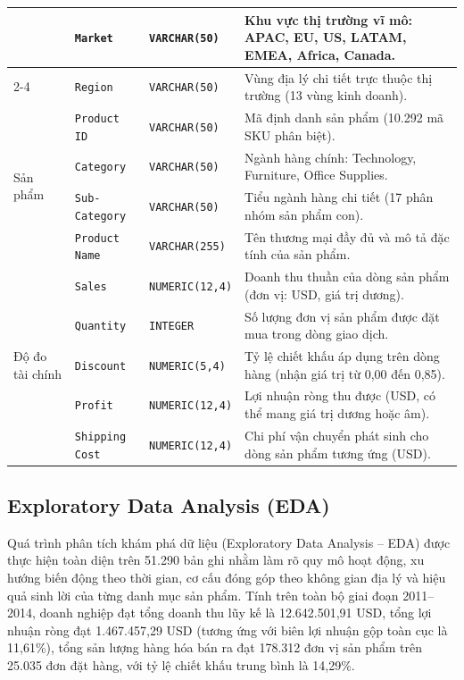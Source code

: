 \begin{table}[H]
\begin{tabularx}{\textwidth}{|l|l|l|X|}
 & \texttt{Market} & \texttt{VARCHAR(50)} & Khu vực thị trường vĩ mô: APAC, EU, US, LATAM, EMEA, Africa, Canada. \\ \cline{2-4}
 & \texttt{Region} & \texttt{VARCHAR(50)} & Vùng địa lý chi tiết trực thuộc thị trường (13 vùng kinh doanh). \\
\hline
\multirow{4}{*}{Sản phẩm} 
 & \texttt{Product ID} & \texttt{VARCHAR(50)} & Mã định danh sản phẩm (10.292 mã SKU phân biệt). \\ \cline{2-4}
 & \texttt{Category} & \texttt{VARCHAR(50)} & Ngành hàng chính: Technology, Furniture, Office Supplies. \\ \cline{2-4}
 & \texttt{Sub-Category} & \texttt{VARCHAR(50)} & Tiểu ngành hàng chi tiết (17 phân nhóm sản phẩm con). \\ \cline{2-4}
 & \texttt{Product Name} & \texttt{VARCHAR(255)} & Tên thương mại đầy đủ và mô tả đặc tính của sản phẩm. \\
\hline
\multirow{5}{*}{Độ đo tài chính} 
 & \texttt{Sales} & \texttt{NUMERIC(12,4)} & Doanh thu thuần của dòng sản phẩm (đơn vị: USD, giá trị dương). \\ \cline{2-4}
 & \texttt{Quantity} & \texttt{INTEGER} & Số lượng đơn vị sản phẩm được đặt mua trong dòng giao dịch. \\ \cline{2-4}
 & \texttt{Discount} & \texttt{NUMERIC(5,4)} & Tỷ lệ chiết khấu áp dụng trên dòng hàng (nhận giá trị từ 0,00 đến 0,85). \\ \cline{2-4}
 & \texttt{Profit} & \texttt{NUMERIC(12,4)} & Lợi nhuận ròng thu được (USD, có thể mang giá trị dương hoặc âm). \\ \cline{2-4}
 & \texttt{Shipping Cost} & \texttt{NUMERIC(12,4)} & Chi phí vận chuyển phát sinh cho dòng sản phẩm tương ứng (USD). \\
\hline
\end{tabularx}
\end{table}

\subsection{Exploratory Data Analysis (EDA)}

Quá trình phân tích khám phá dữ liệu (Exploratory Data Analysis -- EDA) được thực hiện toàn diện trên 51.290 bản ghi nhằm làm rõ quy mô hoạt động, xu hướng biến động theo thời gian, cơ cấu đóng góp theo không gian địa lý và hiệu quả sinh lời của từng danh mục sản phẩm. Tính trên toàn bộ giai đoạn 2011--2014, doanh nghiệp đạt tổng doanh thu lũy kế là 12.642.501,91 USD, tổng lợi nhuận ròng đạt 1.467.457,29 USD (tương ứng với biên lợi nhuận gộp toàn cục là 11,61\%), tổng sản lượng hàng hóa bán ra đạt 178.312 đơn vị sản phẩm trên 25.035 đơn đặt hàng, với tỷ lệ chiết khấu trung bình là 14,29\%.

